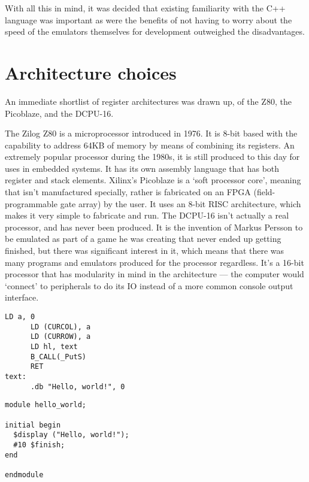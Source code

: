 With all this in mind, it was decided that existing familiarity with the C++
language was important as were the benefits of not having to worry about the
speed of the emulators themselves for development outweighed the disadvantages.

\section{Architecture choices}
An immediate shortlist of register architectures was drawn up, of the Z80, the
Picoblaze, and the DCPU-16.

The Zilog Z80 is a microprocessor introduced in 1976. It is 8-bit based with the
capability to address 64KB of memory by means of combining its registers. An
extremely popular processor during the 1980s, it is still produced to this day
for uses in embedded systems. It has its own assembly language that has both
register and stack elements. Xilinx's Picoblaze is a `soft processor core',
meaning that isn't manufactured specially, rather is fabricated on an FPGA
(field-programmable gate array) by the user. It uses an 8-bit RISC architecture,
which makes it very simple to fabricate and run. The DCPU-16 isn't actually a
real processor, and has never been produced. It is the invention of Markus
Persson to be emulated as part of a game he was creating that never ended up
getting finished, but there was significant interest in it, which means that
there was many programs and emulators produced for the processor regardless.
It's a 16-bit processor that has modularity in mind in the architecture --- the
computer would `connect' to peripherals to do its IO instead of a more common
console output interface.

\noindent\begin{minipage}{0.5\textwidth}
\begin{lstlisting}[caption={Z80 ASM}]
      LD a, 0
      LD (CURCOL), a
      LD (CURROW), a
      LD hl, text
      B_CALL(_PutS)
      RET
text:
      .db "Hello, world!", 0
\end{lstlisting}%
\end{minipage}%
\noindent\begin{minipage}{0.5\textwidth}
\begin{lstlisting}[caption={Picoblaze ASM}]
module hello_world;

initial begin
  $display ("Hello, world!");
  #10 $finish;
end

endmodule
\end{lstlisting}%
\end{minipage}


